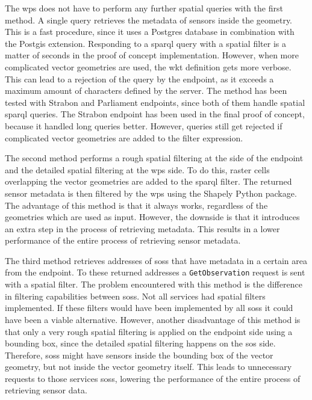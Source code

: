The \ac{wps} does not have to perform any further spatial queries with the first method. A single query retrieves the metadata of sensors inside the geometry. This is a fast procedure, since it uses a Postgres database in combination with the Postgis extension. Responding to a \ac{sparql} query with a spatial filter is a matter of seconds in the proof of concept implementation. However, when more complicated vector geometries are used, the \ac{wkt} definition gets more verbose. This can lead to a rejection of the query by the endpoint, as it exceeds a maximum amount of characters defined by the server. The method has been tested with Strabon and Parliament endpoints, since both of them handle spatial \ac{sparql} queries. The Strabon endpoint has been used in the final proof of concept, because it handled long queries better. However, queries still get rejected if complicated vector geometries are added to the filter expression.    

The second method performs a rough spatial filtering at the side of the endpoint and the detailed spatial filtering at the \ac{wps} side. To do this, raster cells overlapping the vector geometries are added to the \ac{sparql} filter. The returned sensor metadata is then filtered by the \ac{wps} using the Shapely Python package. The advantage of this method is that it always works, regardless of the geometries which are used as input. However, the downside is that it introduces an extra step in the process of retrieving metadata. This results in a lower performance of the entire process of retrieving sensor metadata.  

The third method retrieves addresses of \aclp{sos} that have metadata in a certain area from the endpoint. To these returned addresses a \texttt{GetObservation} request is sent with a spatial filter. The problem encountered with this method is the difference in filtering capabilities between \aclp{sos}. Not all services had spatial filters implemented. If these filters would have been implemented by all \aclp{sos} it could have been a viable alternative. However, another disadvantage of this method is that only a very rough spatial filtering is applied on the endpoint side using a bounding box, since the detailed spatial filtering happens on the \ac{sos} side. Therefore, \aclp{sos} might have sensors inside the bounding box of the vector geometry, but not inside the vector geometry itself. This leads to unnecessary requests to those services \aclp{sos}, lowering the performance of the entire process of retrieving sensor data.


